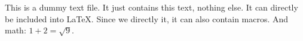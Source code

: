 This is a dummy text file.
It just contains this text, nothing else.
It can directly be included into \LaTeX.
Since we directly \verb== it, it can also contain macros.
And math: $1+2=\sqrt{9}$.
